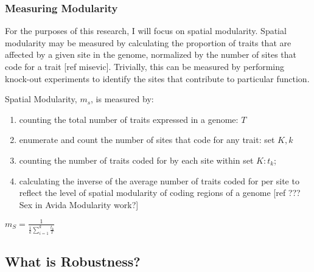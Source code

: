 \subsubsection{Measuring Modularity}

For the purposes of this research, I will focus on spatial modularity. Spatial modularity may be measured by calculating the proportion of traits that are affected by a given site in the genome, normalized by the number of sites that code for a trait [ref misevic]. Trivially, this can be measured by performing knock-out experiments to identify the sites that contribute to particular function.

Spatial Modularity, $m_s$, is measured by:

\begin{enumerate}
\item counting the total number of traits expressed in a genome: $T$
\item enumerate and count the number of sites that code for any trait: set $K, k$
\item counting the number of traits coded for by each site within set $K: t_k$;
\item calculating the inverse of the average number of traits coded for per site to reflect the level of spatial modularity of coding regions of a genome [ref ??? Sex in Avida Modularity work?]
\end{enumerate}

$m_{S} =  \frac{1}{\frac{1}{k} {\sum_{i=1}^{k} \frac{t_{k}}{T}}}$ 


\subsection{What is Robustness? }

